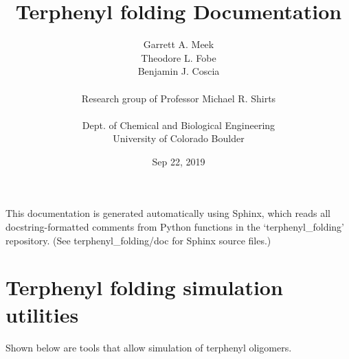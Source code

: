 \documentclass[letterpaper,12pt,english,openany,oneside]{sphinxmanual}
\title{Terphenyl folding Documentation}
\date{Sep 22, 2019}
\author{Garrett A. Meek\\Theodore L. Fobe\\Benjamin J. Coscia\\ \\Research group of Professor Michael R. Shirts\\ \\Dept. of Chemical and Biological Engineering\\University of Colorado Boulder}
\begin{document}
\pagestyle{empty}
\sphinxmaketitle
\pagestyle{plain}
\sphinxtableofcontents
\pagestyle{normal}
\label{\detokenize{index::doc}}


This documentation is generated automatically using Sphinx, which reads all docstring-formatted comments from Python functions in the ‘terphenyl\_folding’ repository.  (See terphenyl\_folding/doc for Sphinx source files.)


\chapter{Terphenyl folding simulation utilities}
\label{\detokenize{simulation:terphenyl-folding-simulation-utilities}}\label{\detokenize{simulation::doc}}
Shown below are tools that allow simulation of terphenyl oligomers.

\label{\detokenize{simulation:module-simulation}}
\end{document}
